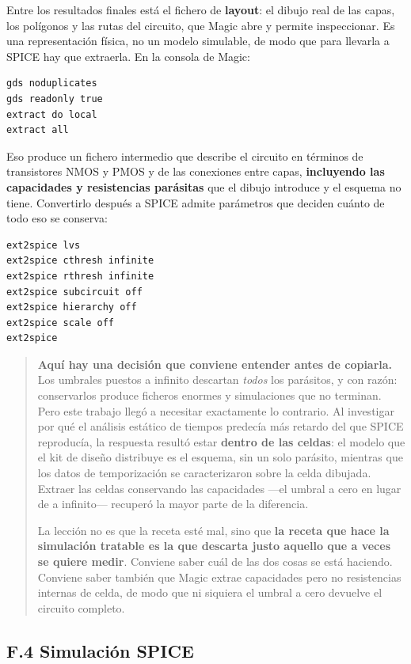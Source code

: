Entre los resultados finales está el fichero de \textbf{layout}: el
dibujo real de las capas, los polígonos y las rutas del circuito, que
Magic abre y permite inspeccionar. Es una representación física, no un
modelo simulable, de modo que para llevarla a SPICE hay que extraerla.
En la consola de Magic:

\begin{verbatim}
gds noduplicates
gds readonly true
extract do local
extract all
\end{verbatim}

Eso produce un fichero intermedio que describe el circuito en términos
de transistores NMOS y PMOS y de las conexiones entre capas,
\textbf{incluyendo las capacidades y resistencias parásitas} que el
dibujo introduce y el esquema no tiene. Convertirlo después a SPICE
admite parámetros que deciden cuánto de todo eso se conserva:

\begin{verbatim}
ext2spice lvs
ext2spice cthresh infinite
ext2spice rthresh infinite
ext2spice subcircuit off
ext2spice hierarchy off
ext2spice scale off
ext2spice
\end{verbatim}

\begin{quote}
\textbf{Aquí hay una decisión que conviene entender antes de copiarla.}
Los umbrales puestos a infinito descartan \emph{todos} los parásitos, y
con razón: conservarlos produce ficheros enormes y simulaciones que no
terminan. Pero este trabajo llegó a necesitar exactamente lo contrario.
Al investigar por qué el análisis estático de tiempos predecía más
retardo del que SPICE reproducía, la respuesta resultó estar
\textbf{dentro de las celdas}: el modelo que el kit de diseño distribuye
es el esquema, sin un solo parásito, mientras que los datos de
temporización se caracterizaron sobre la celda dibujada. Extraer las
celdas conservando las capacidades ---el umbral a cero en lugar de a
infinito--- recuperó la mayor parte de la diferencia.

La lección no es que la receta esté mal, sino que \textbf{la receta que
hace la simulación tratable es la que descarta justo aquello que a veces
se quiere medir}. Conviene saber cuál de las dos cosas se está haciendo.
Conviene saber también que Magic extrae capacidades pero no resistencias
internas de celda, de modo que ni siquiera el umbral a cero devuelve el
circuito completo.
\end{quote}

\subsection{F.4 Simulación SPICE}\label{f.4-simulaciuxf3n-spice}

